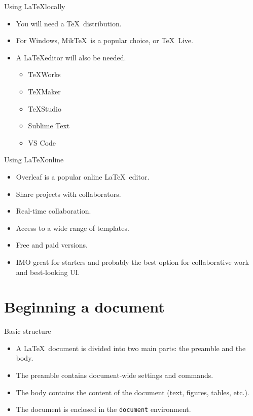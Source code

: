 \documentclass[t,12pt,xcolor=dvipsnames]{beamer}
\begin{document}
\begin{frame}{Using \LaTeX locally}
    \begin{itemize}
        \item You will need a \TeX \ distribution.
        \item For Windows, Mik\TeX \ is a popular choice, or \TeX \ Live.
        \item A \LaTeX editor will also be needed.
        \begin{itemize}
            \item \TeX Works
            \item \TeX Maker
            \item \TeX Studio
            \item Sublime Text
            \item VS Code
        \end{itemize}
    \end{itemize}
\end{frame}

\begin{frame}{Using \LaTeX online}
    \begin{itemize}
        \item Overleaf is a popular online \LaTeX \ editor.
        \item Share projects with collaborators.
        \item Real-time collaboration.
        \item Access to a wide range of templates.
        \item Free and paid versions.
        \item IMO great for starters and probably the best option for collaborative work and best-looking UI.
    \end{itemize}
\end{frame}

\section{Beginning a document}

\begin{frame}{Basic structure}
    \begin{itemize}
        \item A \LaTeX \ document is divided into two main parts: the preamble and the body.
        \item The preamble contains document-wide settings and commands.
        \item The body contains the content of the document (text, figures, tables, etc.).
        \item The document is enclosed in the \texttt{document} environment.
    \end{itemize}
\end{frame}
\end{document}

